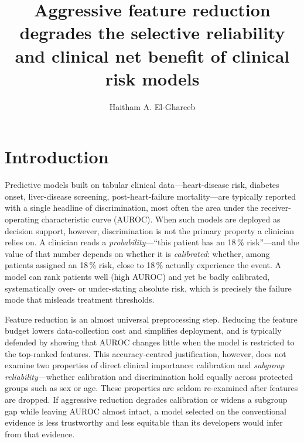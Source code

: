 \documentclass[fleqn,10pt]{wlscirep}
\title{Aggressive feature reduction degrades the selective reliability and clinical net benefit of
clinical risk models}
\author[1,*]{Haitham A. El-Ghareeb}
\affil[1]{Information Systems Department, Faculty of Computers and Information Sciences, Mansoura
University, Mansoura, Egypt}
\affil[*]{Corresponding author: helghareeb@mans.edu.eg}
\newcommand{\result}[1]{#1}
\begin{document}
\flushbottom
\maketitle
\thispagestyle{empty}
\linenumbers

\section{Introduction}
\label{sec:intro}

Predictive models built on tabular clinical data---heart-disease risk, diabetes onset,
liver-disease screening, post-heart-failure mortality---are typically reported with a
single headline of discrimination, most often the area under the receiver-operating
characteristic curve (AUROC). When such models are deployed as decision support, however,
discrimination is not the primary property a clinician relies on. A clinician reads a
\emph{probability}---``this patient has an \result{18\,\%} risk''---and the value of that
number depends on whether it is \emph{calibrated}: whether, among patients assigned an
\result{18\,\%} risk, close to \result{18\,\%} actually experience the event. A model can
rank patients well (high AUROC) and yet be badly calibrated, systematically over- or
under-stating absolute risk, which is precisely the failure mode that misleads treatment
thresholds.

Feature reduction is an almost universal preprocessing step. Reducing the feature budget
lowers data-collection cost and simplifies deployment, and is typically defended by showing
that AUROC changes little when the model is restricted to the top-ranked features. This
accuracy-centred justification, however, does not examine two properties of direct clinical
importance: calibration and \emph{subgroup reliability}---whether calibration and discrimination
hold equally across protected groups such as sex or age. These properties are seldom re-examined
after features are dropped. If aggressive reduction degrades calibration or widens a subgroup gap
while leaving AUROC almost intact, a model selected on the conventional evidence is less
trustworthy and less equitable than its developers would infer from that evidence.
\end{document}
